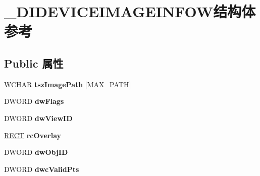 \hypertarget{struct___d_i_d_e_v_i_c_e_i_m_a_g_e_i_n_f_o_w}{}\section{\+\_\+\+D\+I\+D\+E\+V\+I\+C\+E\+I\+M\+A\+G\+E\+I\+N\+F\+O\+W结构体 参考}
\label{struct___d_i_d_e_v_i_c_e_i_m_a_g_e_i_n_f_o_w}
\subsection*{Public 属性}
\begin{DoxyCompactItemize}
\item 
\mbox{\label{struct___d_i_d_e_v_i_c_e_i_m_a_g_e_i_n_f_o_w_a1b0076cce4e640ed61f6c221c0fc1f78}} 
W\+C\+H\+AR {\bfseries tsz\+Image\+Path} \mbox{[}M\+A\+X\+\_\+\+P\+A\+TH\mbox{]}
\item 
\mbox{\label{struct___d_i_d_e_v_i_c_e_i_m_a_g_e_i_n_f_o_w_a372c889d76f5a3b44fdae9a030ad04ff}} 
D\+W\+O\+RD {\bfseries dw\+Flags}
\item 
\mbox{\label{struct___d_i_d_e_v_i_c_e_i_m_a_g_e_i_n_f_o_w_a2ee07bbebb3b016026c959537b892cff}} 
D\+W\+O\+RD {\bfseries dw\+View\+ID}
\item 
\mbox{\label{struct___d_i_d_e_v_i_c_e_i_m_a_g_e_i_n_f_o_w_acad0625bd806762d89f5dbcf1d0720a0}} 
\hyperlink{structtag_r_e_c_t}{R\+E\+CT} {\bfseries rc\+Overlay}
\item 
\mbox{\label{struct___d_i_d_e_v_i_c_e_i_m_a_g_e_i_n_f_o_w_a2f6307f75cb8189afaa139d92f113f93}} 
D\+W\+O\+RD {\bfseries dw\+Obj\+ID}
\item 
\mbox{\label{struct___d_i_d_e_v_i_c_e_i_m_a_g_e_i_n_f_o_w_a7012db3a7a411ad3df4c146f3ed4ef40}} 
D\+W\+O\+RD {\bfseries dwc\+Valid\+Pts}
\item 
\mbox{\label{struct___d_i_d_e_v_i_c_e_i_m_a_g_e_i_n_f_o_w_aae5011d680c8ab5779dc4bd2e02932a9}} 

\end{DoxyCompactItemize}
